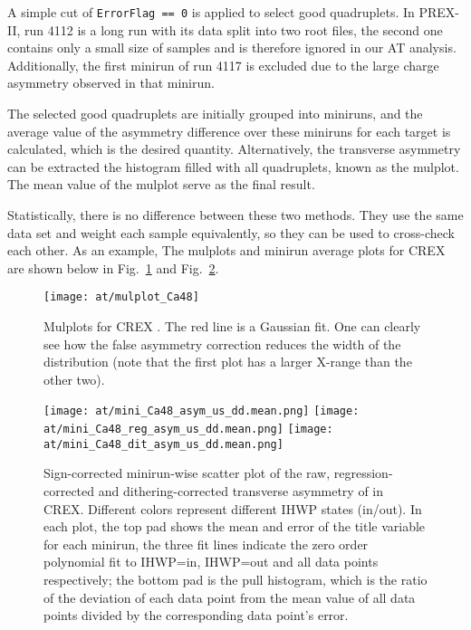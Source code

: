 A simple cut of \verb|ErrorFlag == 0| is applied to select good quadruplets.
In PREX-II, run 4112 is a long run with its data split into two root files, the
second one contains only a small size of samples and is therefore ignored in our AT analysis.
Additionally, the first minirun of run 4117 is excluded due to the large charge asymmetry
observed in that minirun. 

The selected good quadruplets are initially grouped into miniruns, and
the average value of the asymmetry difference over these miniruns for each target 
is calculated, which is the desired quantity.
Alternatively, the transverse asymmetry can be extracted the histogram filled with
all quadruplets, known as the mulplot. The mean value of the mulplot serve as
the final result. 

Statistically, there is no difference between these two methods.
They use the same data set and weight each sample equivalently, so they can
be used to cross-check each other. As an example, The mulplots and minirun average plots for
CREX \Ca are shown below in Fig.~\ref{fig:AT_crex_Ca48_mulplot} and 
Fig.~\ref{fig:AT_crex_Ca48_miniruns}.

\begin{figure}[!h]
    \centering
    \texttt{[image: at/mulplot\_Ca48]}
    \caption[AT \Ca Mulplots]
    {Mulplots for CREX \Ca. The red line is a Gaussian fit. One can clearly 
    see how the false asymmetry correction reduces the width of the distribution (note that
    the first plot has a larger X-range than the other two).}
    \label{fig:AT_crex_Ca48_mulplot}
\end{figure}

\begin{figure}[H]
    \centering
    \texttt{[image: at/mini\_Ca48\_asym\_us\_dd.mean.png]}
    \texttt{[image: at/mini\_Ca48\_reg\_asym\_us\_dd.mean.png]}
    \texttt{[image: at/mini\_Ca48\_dit\_asym\_us\_dd.mean.png]}
    \caption[AT \Ca asymmetry plot]
    {Sign-corrected minirun-wise scatter plot of the raw, regression-corrected and 
    dithering-corrected transverse asymmetry of \Ca in CREX. Different colors represent
    different IHWP states (in/out). In each plot, the top pad shows the 
    mean and error of the title variable for each minirun, the three fit lines indicate
    the zero order polynomial fit to IHWP=in, IHWP=out and all data points respectively;
    the bottom pad is the pull histogram, which is the ratio of the deviation 
    of each data point from the mean value of all data points divided by the corresponding
    data point's error.
    }
    \label{fig:AT_crex_Ca48_miniruns}
\end{figure}


